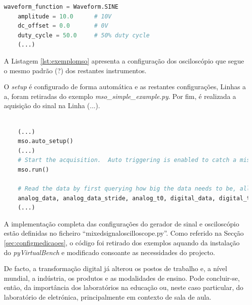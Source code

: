 \begin{minipage}{0.9\linewidth}
	\begin{lstlisting}[language=Python,escapechar=|, caption=Exemplo configuração do gerador de sinal - \textit{mixed\textunderscore signal\textunderscore oscilloscope.py}, label=lst:exemplogerador]
	waveform_function = Waveform.SINE
	amplitude = 10.0      # 10V
	dc_offset = 0.0       # 0V
	duty_cycle = 50.0     # 50% duty cycle
	(...)
	\end{lstlisting}
\end{minipage}

A Listagem \ref{lst:exemplomso} apresenta a configuração dos osciloscópio que segue o mesmo padrão (?) dos restantes instrumentos. 

O \textit{setup} é configurado de forma automática e as restantes configurações, Linhas a a, foram retiradas do exemplo \textit{mso\_simple\_example.py}. Por fim, é realizada a aquisição do sinal na Linha (...).

\begin{minipage}{0.9\linewidth}
	\begin{lstlisting}[language=Python,escapechar=|, caption=Exemplo configuração do oscilscópio - \textit{mixed\textunderscore signal\textunderscore oscilloscope.py}, label=lst:exemplomso]
	
	(...)
	mso.auto_setup()
	(...)
	# Start the acquisition.  Auto triggering is enabled to catch a misconfigured trigger condition.
	mso.run()
	
	# Read the data by first querying how big the data needs to be, allocating the memory, and finally performing the read.
    analog_data, analog_data_stride, analog_t0, digital_data, digital_timestamps, digital_t0, trigger_timestamp, trigger_reason = mso.read_analog_digital_u64()
	(...)
	\end{lstlisting}
\end{minipage}

A implementação completa das configurações do gerador de sinal e osciloscópio estão definidas no ficheiro ``mixed\textunderscore signal\textunderscore oscilloscope.py''. Como referido na Secção \ref{sec:configmedicaoes}, o código foi retirado dos exemplos aquando da instalação do \textit{pyVirtualBench} e modificado consoante as necessidades do projecto.

De facto, a transformação digital já alterou os postos de trabalho e, a nível mundial, a indústria, os produtos e as modalidades de ensino. Pode concluir-se, então, da importância dos laboratórios na educação ou, neste caso particular, do laboratório de eletrónica, principalmente em contexto de sala de aula.

